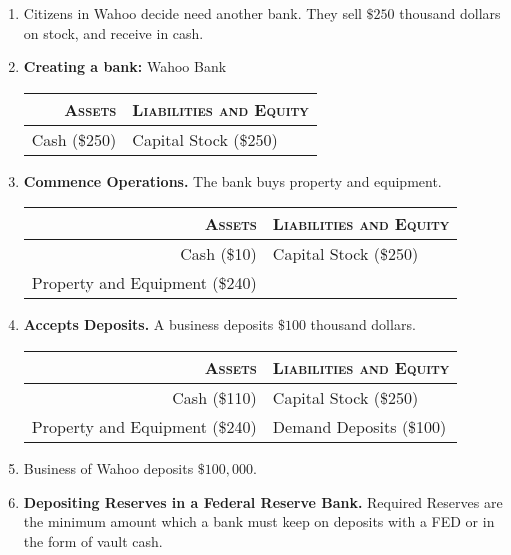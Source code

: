 \begin{enumerate}[label = \textbf{(\arabic*)}]
	\item[] Citizens in Wahoo decide need another bank. They sell $\$250$ thousand dollars on stock, and receive in cash.
	\item \textbf{Creating a bank:} Wahoo Bank
		
		\begin{table}[ht]
			\centering
			\begin{tabular}{r|l}\toprule
				\textsc{Assets}			& \textsc{Liabilities and Equity}	\\ \midrule
				Cash (\$250) & Capital Stock (\$250) \\ \bottomrule
			\end{tabular}
		\end{table}

	\item \textbf{Commence Operations.} The bank buys property and equipment.
		
		\begin{table}[ht]
			\centering
			\begin{tabular}{r|l}\toprule
				\textsc{Assets}			& \textsc{Liabilities and Equity}	\\ \midrule
				Cash (\$10) & Capital Stock (\$250)\\ 
				Property and Equipment (\$240) & \\ \bottomrule
			\end{tabular}
		\end{table}

	\item \textbf{Accepts Deposits.} A business deposits $\$100$ thousand dollars.
		
		\begin{table}[ht]
			\centering
			\begin{tabular}{r|l}\toprule
				\textsc{Assets}			& \textsc{Liabilities and Equity}	\\ \midrule
				Cash (\$110) & Capital Stock (\$250) \\ 
				Property and Equipment (\$240) & Demand Deposits (\$100) \\ \bottomrule
			\end{tabular}
		\end{table}

	\item[] Business of Wahoo deposits $\$100,000$.
	\item \textbf{Depositing Reserves in a Federal Reserve Bank.}
		Required Reserves are the minimum amount which a bank must keep on deposits with a FED or in the form of vault cash.


\end{enumerate}
